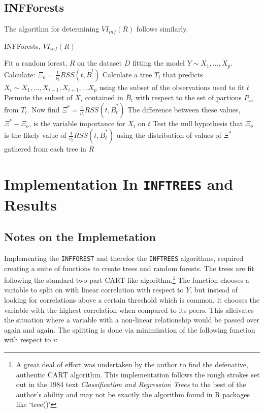 \documentclass[12pt,twoside]{reedthesis}
\begin{document}
  \subsection{INFForests}\label{infforests}
  
  The algorithm for determining \(VI_{inf}(R)\) follows similarly.
  
  \begin{algorithm}
  \caption{INFForests, $VI_{inf}(R)$}
  \label{infforest}
  \begin{algorithmic}[1]
  \State Fit a random forest, $R$ on the dataset $D$ fitting the model $Y \sim X_1,...,X_p$.
  \State Calculate: $\Xi_o =  \frac 1 {\nu_t} RSS(t,\bar{B}^t)$
  \State Calculate a tree $T_i$ that predicts $X_i \sim X_1,...,X_{i-1}, X_{i+1},...X_p$ using the subset of the observations used to fit $t$  
  \State Permute the subset of $X_i$ contained in $\bar{B}_t$ with respect to the set of partions $P_{xi}$ from $T_i$.
  \State Now find $\Xi^* =  \frac 1 {\nu_t} RSS(t,\bar{B}_t^*)$
  \State The difference between these values, $\Xi^* - \Xi_o$,  is the variable importance for $X_i$ on $t$
  \EndFor
  \State Test the null hypothesis that $\Xi_o$ is the likely value of $\frac 1 {\nu_t} RSS(t,\bar{B}_t^*)$ using the distribution of values of $\Xi^*$ gathered from each tree in $R$
  \EndFor
  \end{algorithmic}
  \end{algorithm}
  
  \section{\texorpdfstring{Implementation In \texttt{INFTREES} and
  Results}{Implementation In INFTREES and Results}}\label{implementation-in-inftrees-and-results}
  
  \subsection{Notes on the
  Implemetation}\label{notes-on-the-implemetation}
  
  Implementing the \texttt{INFFOREST} and therefor the \texttt{INFTREES}
  algorithms, required creating a suite of functions to create trees and
  random forests. The trees are fit following the standard two-part
  CART-like algorithm.\footnote{A great deal of effort was undertaken by
    the author to find the defenative, authentic CART algorithm. This
    implementation follows the rough strokes set out in the 1984 text
    \emph{Classification and Regression Trees} to the best of the author's
    ability and may not be exactly the algorithm found in R packages like
    `tree()'} The function chooses a variable to split on with linear
  correlation with respect to \(Y\), but instead of looking for
  correlations above a certain threshold which is common, it chooses the
  variable with the highest correlation when compared to its peers. This
  alleivates the situation where a variable with a non-linear relationship
  would be passed over again and again. The splitting is done via
  minimization of the following function with respect to \(i\):
  
\end{document}
